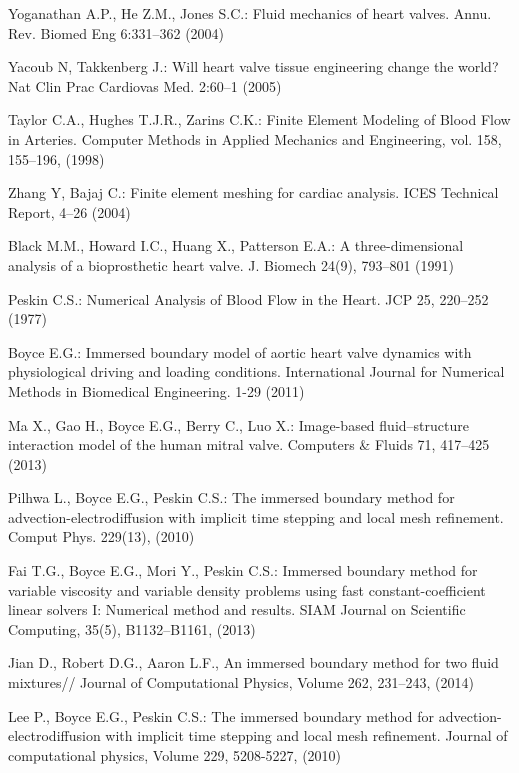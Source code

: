 \documentclass[runningheads,a4paper]{llncs}
\begin{document}
\begin{thebibliography}{4}

 Yoganathan A.P., He Z.M., Jones S.C.: Fluid mechanics of heart valves. Annu. Rev. Biomed Eng 6:331--362 (2004)

 Yacoub N, Takkenberg J.: Will heart valve tissue engineering change the world? Nat Clin Prac Cardiovas Med. 2:60--1 (2005)

 Taylor C.A., Hughes T.J.R., Zarins C.K.: Finite Element Modeling of Blood Flow in Arteries.
Computer Methods in Applied Mechanics and Engineering, vol. 158, 155--196, (1998)

 Zhang Y, Bajaj C.: Finite element meshing for cardiac analysis. ICES Technical Report, 4--26 (2004)

 Black M.M., Howard I.C., Huang X., Patterson E.A.: A three-dimensional analysis of a bioprosthetic heart valve. J. Biomech 24(9), 793--801 (1991)

 Peskin C.S.: Numerical Analysis of Blood Flow in the Heart. JCP 25, 220--252 (1977)

 Boyce E.G.: Immersed boundary model of aortic heart valve dynamics with physiological driving and loading conditions. International Journal for Numerical Methods in Biomedical Engineering. 1-29 (2011)

 Ma X., Gao H., Boyce E.G., Berry C., Luo X.: Image-based fluid–structure interaction model of the human mitral valve. Computers \& Fluids 71, 417–425 (2013)

 Pilhwa L., Boyce E.G., Peskin C.S.: The immersed boundary method for advection-electrodiffusion with implicit time stepping and local mesh refinement. Comput Phys. 229(13), (2010)

 Fai T.G., Boyce E.G., Mori Y., Peskin C.S.: Immersed boundary method for variable viscosity and variable density problems using fast constant-coefficient linear solvers I: Numerical method and results. SIAM Journal on Scientific Computing, 35(5), B1132–B1161, (2013)

 Jian D., Robert D.G., Aaron L.F., An immersed boundary method for two fluid mixtures// Journal of Computational Physics, Volume 262, 231--243, (2014)

 Lee P., Boyce E.G., Peskin C.S.: The immersed boundary method for advection-electrodiffusion with implicit time stepping and local mesh refinement. Journal of computational physics, Volume 229, 5208-5227, (2010)


\end{thebibliography}
\end{document}
